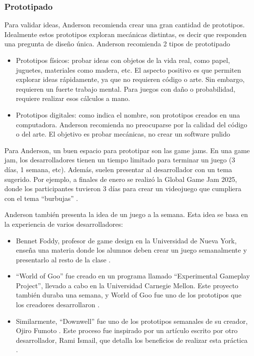 \subsubsection{Prototipado}
\par Para validar ideas, Anderson recomienda crear una gran cantidad de prototipos. Idealmente estos prototipos exploran mecánicas distintas, es decir que responden una pregunta de diseño única. Anderson recomienda 2 tipos de prototipado
\begin{itemize}
  \item Prototipos físicos: probar ideas con objetos de la vida real, como papel, juguetes, materiales como madera, etc. El aspecto positivo es que permiten explorar ideas rápidamente, ya que no requieren código o arte. Sin embargo, requieren un fuerte trabajo mental. Para juegos con daño o probabilidad, requiere realizar esos cálculos a mano.
  \item Prototipos digitales: como indica el nombre, son prototipos creados en una computadora. Anderson recomienda no preocuparse por la calidad del código o del arte. El objetivo es probar mecánicas, no crear un software pulido
\end{itemize}
\par Para Anderson, un buen espacio para prototipar son las game jams. En una game jam, los desarrolladores tienen un tiempo limitado para terminar un juego (3 días, 1 semana, etc). Además, suelen presentar al desarrollador con un tema sugerido. Por ejemplo, a finales de enero se realizó la Global Game Jam 2025, donde los participantes tuvieron 3 días para crear un videojuego que cumpliera con el tema “burbujas” \cite{globalgamejamGlobalGameJam2025}.
\bigbreak
\par Anderson también presenta la idea de un juego a la semana. Esta idea se basa en la experiencia de varios desarrolladores:
\begin{itemize}
  \item Bennet Foddy, profesor de game design en la Universidad de Nueva York, enseña una materia donde los alumnos deben crear un juego semanalmente y presentarlo al resto de la clase \cite{GameWeekTeaching}.
  \item “World of Goo” \cite{WorldGooSteam} fue creado en un programa llamado “Experimental Gameplay Project”, llevado a cabo en la Universidad Carnegie Mellon. Este proyecto también duraba una semana, y World of Goo fue uno de los prototipos que los creadores desarrollaron \cite{InterviewGrayGabler,Flashback2008Making}.
  \item Similarmente, “Downwell” \cite{DownwellSteam} fue uno de los prototipos semanales de su creador, Ojiro Fumoto \cite{crecenteHeresOnedev8month2015}. Este proceso fue inspirado por un artículo escrito por otro desarrollador, Rami Ismail, que detalla los beneficios de realizar esta práctica \cite{GameWeekGetting}.
\end{itemize}

